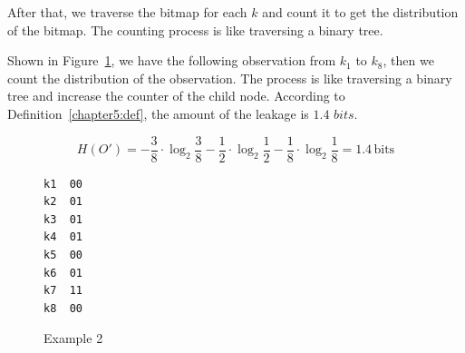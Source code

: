 After that, we traverse the bitmap for each $k$ and count it to get the distribution of the bitmap. The counting process is like traversing a binary tree.

\begin{myexample}
Shown in Figure~\ref{fig:design:example2}, we have the following observation from $k_1$ to $k_8$, then we count the distribution of  the observation. The process is like traversing a binary tree and increase the counter of the child node. According to Definition~\ref{chapter5:def}, the amount of the leakage is $1.4$ $\mathit{bits}$.

\begin{displaymath}
  H(O') = - \frac{3}{8} \cdot \log_2{\frac{3}{8}}- \frac{1}{2} \cdot \log_2{\frac{1}{2}}
  - \frac{1}{8} \cdot \log_2{\frac{1}{8}} = 1.4 \,\mathrm{bits}
\end{displaymath}

\begin{figure}[h]
  \begin{minipage}{0.3\linewidth}
    \end{minipage}
  \hfill
  \begin{minipage}{0.15\linewidth}
    {
      \begin{lstlisting}[frame=none, numbers=none]
k1  00
k2  01
k3  01
k4  01
k5  00
k6  01
k7  11
k8  00
\end{lstlisting}
    }
  \end{minipage}
  \hfill
  \begin{minipage}{0.3\linewidth}
  \end{minipage}
  \caption{Example 2}\label{fig:design:example2}
\end{figure}
\end{myexample}


